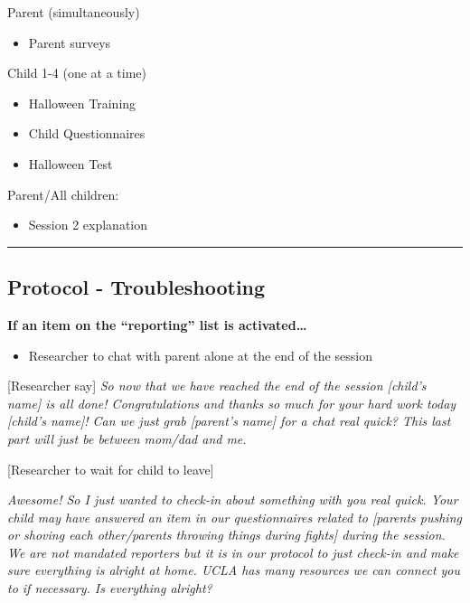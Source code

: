 \documentclass[]{book}
\providecommand{\tightlist}{%
  \setlength{\itemsep}{0pt}\setlength{\parskip}{0pt}}
\begin{document}
Parent (simultaneously)

\begin{itemize}
\tightlist
\item
  Parent surveys
\end{itemize}

Child 1-4 (one at a time)

\begin{itemize}
\tightlist
\item
  Halloween Training
\item
  Child Questionnaires
\item
  Halloween Test
\end{itemize}

Parent/All children:

\begin{itemize}
\tightlist
\item
  Session 2 explanation
\end{itemize}

\begin{center}\rule{0.5\linewidth}{0.5pt}\end{center}

\hypertarget{protocol---troubleshooting}{%
\subsection{Protocol - Troubleshooting}\label{protocol---troubleshooting}}

\textbf{If an item on the ``reporting'' list is activated\ldots{}}

\begin{itemize}
\tightlist
\item
  Researcher to chat with parent alone at the end of the session
\end{itemize}

{[}Researcher say{]} \emph{So now that we have reached the end of the session {[}child's name{]} is all done! Congratulations and thanks so much for your hard work today {[}child's name{]}! Can we just grab {[}parent's name{]} for a chat real quick? This last part will just be between mom/dad and me.}

{[}Researcher to wait for child to leave{]}

\emph{Awesome! So I just wanted to check-in about something with you real quick. Your child may have answered an item in our questionnaires related to {[}parents pushing or shoving each other/parents throwing things during fights{]} during the session. We are not mandated reporters but it is in our protocol to just check-in and make sure everything is alright at home. UCLA has many resources we can connect you to if necessary. Is everything alright?}
\end{document}
